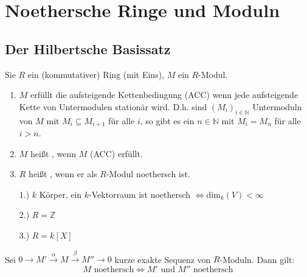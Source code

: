 \chapter{Noethersche Ringe und Moduln}

\section{Der Hilbertsche Basissatz}

\begin{Def}
  Sie $R$ ein (kommutativer) Ring (mit Eins), $M$ ein $R$-Modul.
  \begin{enumerate}
    \item $M$ erfüllt die aufsteigende Kettenbedingung (ACC) wenn jede
          aufsteigende Kette von Untermodulen stationär wird. D.h. sind
          $(M_i)_{i \in \mathbb{N}}$ Untermoduln von $M$ mit $M_i \subseteq 
          M_{i+1}$ für alle $i$, so gibt es ein $n \in \mathbb{N}$ mit $M_i =
          M_n$ für alle $i > n$.
    \item $M$ heißt , wenn $M$ (ACC) erfüllt.
    \item $R$ heißt , wenn er als $R$-Modul noethersch ist.
\end{enumerate}
\end{Def}

\begin{nnBsp}
  \begin{enumerate}
    \item[1.)] $k$ Körper, ein $k$-Vektorraum ist noethersch $\Leftrightarrow
                 \mbox{dim}_k(V) < \infty$
    \item[2.)] $R = \mathbb{Z}$
    \item[3.)] $R = k[X]$
  \end{enumerate}
\end{nnBsp}

\begin{Bem}
\label{2.2}
  Sei $0 \to M' \overset{\alpha}{\to} M \overset{\beta}{\to} M'' \to 0$ kurze
  exakte Sequenz von $R$-Moduln. Dann gilt:
  \[M \mbox{ noethersch} \Leftrightarrow M' \mbox{ und } M'' \mbox{ noethersch}\]
\end{Bem}

